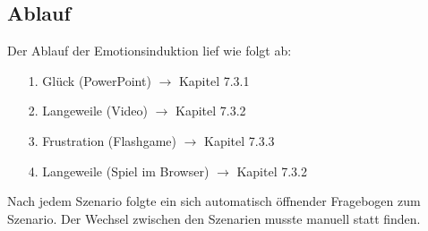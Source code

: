 \subsection{Ablauf} \label{ablauf-1}



Der Ablauf der Emotionsinduktion lief wie folgt ab:

\begin{itemize}
\item[1.] Gl{\"u}ck (PowerPoint) $\rightarrow$ Kapitel 7.3.1
\item[2.] Langeweile (Video) $\rightarrow$ Kapitel 7.3.2
\item[3.] Frustration (Flashgame) $\rightarrow$ Kapitel 7.3.3
\item[4.] Langeweile (Spiel im Browser) $\rightarrow$ Kapitel 7.3.2
\end{itemize}

Nach jedem Szenario folgte ein sich automatisch {\"o}ffnender Fragebogen zum Szenario. 
Der Wechsel zwischen den Szenarien musste manuell statt finden.